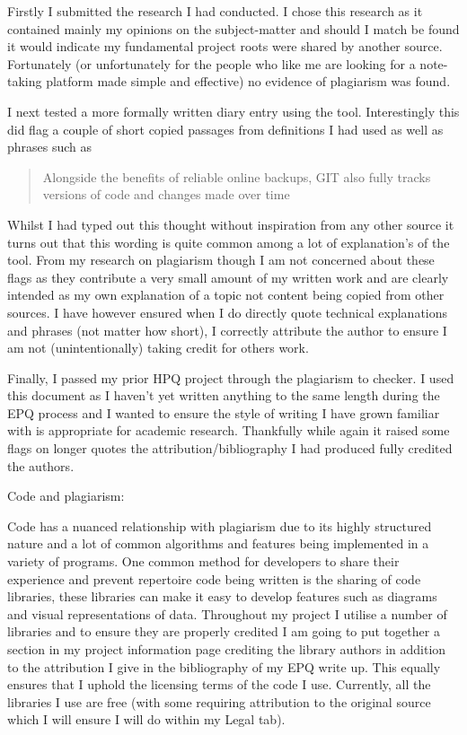 Firstly I submitted the  research I had conducted. I chose this research as it contained mainly my opinions on the subject-matter and should I match be found it would indicate my fundamental project roots were shared by another source. Fortunately (or unfortunately for the people who like me are looking for a  note-taking platform made simple and effective) no evidence of plagiarism was found.

I next tested a more formally written diary entry using the tool. Interestingly this did flag a couple of short copied passages from definitions I had used as well as phrases such as
\begin{quote}
    Alongside the benefits of reliable online backups, GIT also fully tracks versions of code and changes made over time
\end{quote}

Whilst I had typed out this thought without inspiration from any other source it turns out that this wording is quite common among a lot of explanation's of the tool. From my research on plagiarism though I am not concerned about these flags as they contribute a very small amount of my written work and are clearly intended as my own explanation of a topic not content being copied from other sources. I have however ensured when I do directly quote technical explanations and phrases (not matter how short), I correctly attribute the author to ensure I am not (unintentionally) taking credit for others work.

Finally, I passed my prior HPQ project through the plagiarism to checker. I used this document as I haven't yet written anything to the same length during the EPQ process and I wanted to ensure the style of writing I have grown familiar with is appropriate for academic research. Thankfully while again it raised some flags on longer quotes the attribution/bibliography I had produced fully credited the authors.



Code and plagiarism:

Code has a nuanced relationship with plagiarism due to its highly structured nature and a lot of common algorithms and features being implemented in a variety of programs. One common method for developers to share their experience and prevent repertoire code being written is the sharing of code libraries, these libraries can make it easy to develop features such as diagrams and visual representations of data. Throughout my project I utilise a number of libraries and to ensure they are properly credited I am going to put together a section in my project information page crediting the library authors in addition to the attribution I give in the bibliography of my EPQ write up. This equally ensures that I uphold the licensing terms of the code I use. Currently, all the libraries I use are free (with some requiring attribution to the original source which I will ensure I will do within my Legal tab).



